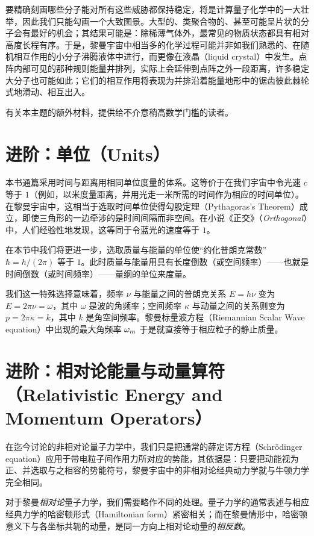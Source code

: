 要精确刻画哪些分子能对所有这些威胁都保持稳定，将是计算量子化学中的一大壮举，因此我们只能勾画一个大致图景。大型的、类聚合物的、甚至可能呈片状的分子会有最好的机会；其结果可能是：除稀薄气体外，最常见的物质状态都具有相对高度长程有序。于是，黎曼宇宙中相当多的化学过程可能并非如我们熟悉的、在随机相互作用的小分子沸腾液体中进行，而更像在液晶（liquid crystal）中发生。点阵内部可见的那种规则能量井排列，实际上会延伸到点阵之外一段距离，许多稳定大分子也可能如此；它们的相互作用将表现为并排沿着能量地形中的锯齿彼此棘轮式地滑动、相互出入。

有关本主题的额外材料，提供给不介意稍高数学门槛的读者。

\section{进阶：单位（Units）}

本书通篇采用时间与距离用相同单位度量的体系。这等价于在我们宇宙中令光速 $c$ 等于 $1$（例如，以米度量距离，并用光走一米所需的时间作为相应的时间单位）。在黎曼宇宙中，这相当于选取时间单位使得勾股定理（Pythagoras's Theorem）成立，即使三角形的一边牵涉的是时间间隔而非空间。在小说《正交》（\emph{Orthogonal}）中，人们经验性地发现，这等同于令蓝光的速度等于 $1$。

在本节中我们将更进一步，选取质量与能量的单位使“约化普朗克常数” $\hbar=h/(2\pi)$ 等于 $1$。此时质量与能量用具有长度倒数（或空间频率）——也就是时间倒数（或时间频率）——量纲的单位来度量。

我们这一特殊选择意味着，频率 $\nu$ 与能量之间的普朗克关系 $E=h\nu$ 变为 $E=2\pi\nu=\omega$，其中 $\omega$ 是波的角频率；空间频率 $\kappa$ 与动量之间的关系则变为 $p=2\pi\kappa=k$，其中 $k$ 是角空间频率。黎曼标量波方程（Riemannian Scalar Wave equation）中出现的最大角频率 $\omega_m$ 于是就直接等于相应粒子的静止质量。

\section{进阶：相对论能量与动量算符（Relativistic Energy and Momentum Operators）}

在迄今讨论的非相对论量子力学中，我们只是把通常的薛定谔方程（Schrödinger equation）应用于带电粒子间作用力所对应的势能，其依据是：只要把动能视为正、并选取与之相容的势能符号，黎曼宇宙中的非相对论经典动力学就与牛顿力学完全相同。

对于黎曼\emph{相对论}量子力学，我们需要略作不同的处理。量子力学的通常表述与相应经典力学的哈密顿形式（Hamiltonian form）紧密相关；而在黎曼情形中，哈密顿意义下与各坐标共轭的动量，是同一方向上相对论动量的\emph{相反数}。

